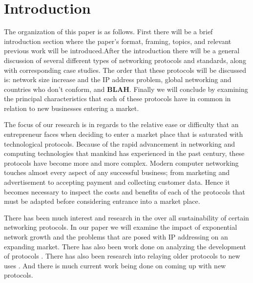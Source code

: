 \section{Introduction}

%
%


The organization of this paper is as follows. First there will be a brief 
introduction section where the paper's format, framing, topics, and relevant previous work will
be introduced.After the introduction there will be a general discussion of several different
types of networking protocols and standards, along with corresponding case 
studies. The order that these protocols will be discussed is: network size
increase and the IP address problem, global networking and countries who don't
conform, and \textbf{BLAH}. Finally we will conclude by examining the 
principal characteristics that each of these protocols have in common in 
relation to new businesses entering a market.


The focus of our research is in regards to the relative ease or difficulty 
that an entrepreneur faces when deciding to enter a market place that is 
saturated with technological protocols. Because of the rapid advancement in 
networking and computing technologies that mankind has experienced in the past
century, these protocols have become more and more complex. Modern computer 
networking touches almost every aspect of any successful business; from 
marketing and advertisement to accepting payment and collecting customer data.
Hence it becomes necessary to inspect the costs and benefits of each of the 
protocols that must be adapted before considering entrance into a market place. 


There has been much interest and research in the over all sustainability of 
certain networking protocols\cite{4124025}. In our paper we will examine the impact of
exponential network growth and the problems that are posed with IP addressing on an expanding
market. There has also been work done on analyzing the development of protocols
\cite{4375858}. There has also been research into relaying older protocols to new uses
\cite{6296937}. And there is much current work being done on coming up with new
protocols\cite{5977081}. 


